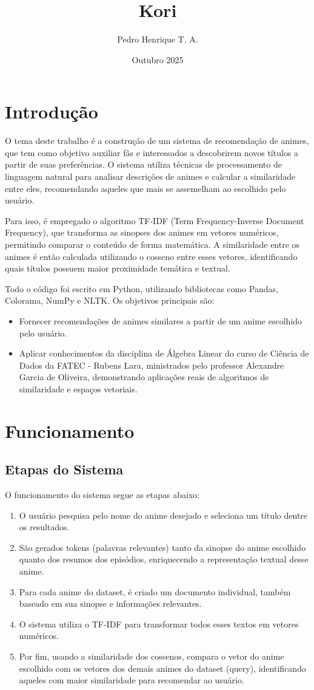 \documentclass{article}
\title{Kori}
\author{Pedro Henrique T. A.}
\date{Outubro 2025}
\begin{document}
\maketitle

\section{Introdução}
O tema deste trabalho é a construção de um sistema de recomendação de animes, que tem como objetivo auxiliar fãs e interessados a descobrirem novos títulos a partir de suas preferências. O sistema utiliza técnicas de processamento de linguagem natural para analisar descrições de animes e calcular a similaridade entre eles, recomendando aqueles que mais se assemelham ao escolhido pelo usuário.

Para isso, é empregado o algoritmo TF-IDF (Term Frequency-Inverse Document Frequency), que transforma as sinopses dos animes em vetores numéricos, permitindo comparar o conteúdo de forma matemática. A similaridade entre os animes é então calculada utilizando o cosseno entre esses vetores, identificando quais títulos possuem maior proximidade temática e textual.

Todo o código foi escrito em Python, utilizando bibliotecas como Pandas, Colorama, NumPy e NLTK. Os objetivos principais são:
\begin{itemize}
    \item Fornecer recomendações de animes similares a partir de um anime escolhido pelo usuário.
    \item Aplicar conhecimentos da disciplina de Álgebra Linear do curso de Ciência de Dados da FATEC - Rubens Lara, ministrados pelo professor Alexandre Garcia de Oliveira, demonstrando aplicações reais de algoritmos de similaridade e espaços vetoriais.
\end{itemize}

\section{Funcionamento}
\subsection*{Etapas do Sistema}
O funcionamento do sistema segue as etapas abaixo:
\begin{enumerate}
    \item O usuário pesquisa pelo nome do anime desejado e seleciona um título dentre os resultados.
    \item São gerados tokens (palavras relevantes) tanto da sinopse do anime escolhido quanto dos resumos dos episódios, enriquecendo a representação textual desse anime.
    \item Para cada anime do dataset, é criado um documento individual, também baseado em sua sinopse e informações relevantes.
    \item O sistema utiliza o TF-IDF para transformar todos esses textos em vetores numéricos.
    \item Por fim, usando a similaridade dos cossenos, compara o vetor do anime escolhido com os vetores dos demais animes do dataset (query), identificando aqueles com maior similaridade para recomendar ao usuário.
\end{enumerate}
\end{document}
